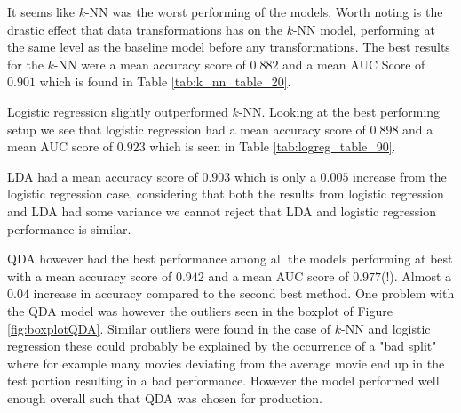 \documentclass[../../project.tex]{subfiles}
\begin{document}
	It seems like $k$-NN was the worst performing of the models. Worth noting is the drastic effect that data transformations has on the $k$-NN model, performing at the same level as the baseline model before any transformations. The best results for the $k$-NN were a mean accuracy score of $0.882$ and a mean AUC Score of $0.901$ which is found in Table \ref{tab:k_nn_table_20}.
	
	Logistic regression slightly outperformed $k$-NN. Looking at the best performing setup we see that logistic regression had a mean accuracy score of $0.898$ and a mean AUC score of $0.923$ which is seen in Table \ref{tab:logreg_table_90}.  
	
	LDA had a mean accuracy score of $0.903$ which is only a $0.005$ increase from the logistic regression case, considering that both the results from logistic regression and LDA had some variance we cannot reject that LDA and logistic regression performance is similar.
	
	QDA however had the best performance among all the models performing at best with a mean accuracy score of $0.942$ and a mean AUC score of $0.977$(!). Almost a $0.04$ increase in accuracy compared to the second best method. One problem with the QDA model was however the outliers seen in the boxplot of Figure \ref{fig:boxplotQDA}. Similar outliers were found in the case of $k$-NN and logistic regression these could probably be explained by the occurrence of a "bad split" where for example many movies deviating from the average movie end up in the test portion resulting in a bad performance. However the model performed well enough overall such that QDA was chosen for production.
	
\end{document}
